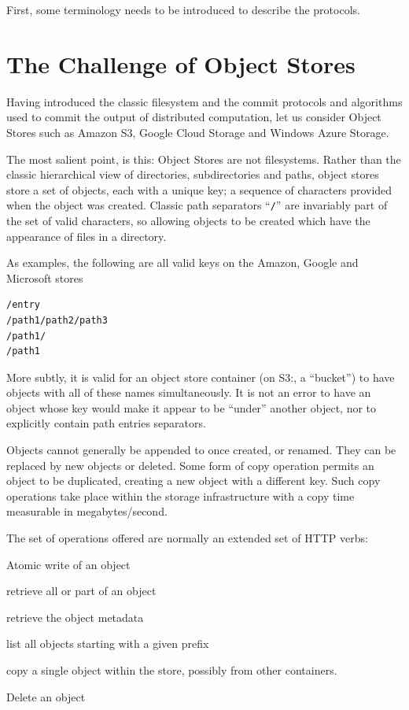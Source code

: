 \documentclass[manuscript]{acmart}
\begin{document}
First, some terminology needs to be introduced to describe
the protocols.


\section{The Challenge of Object Stores}
\label{sec:object-stores}

Having introduced the classic filesystem and the commit protocols and algorithms
used to commit the output of distributed computation, let us consider
Object Stores such as Amazon S3, Google Cloud Storage and
Windows Azure Storage.



The most salient point, is this: Object Stores are not filesystems.
Rather than the classic hierarchical view of directories, subdirectories
and paths, object stores store a set of objects, each with a unique key;
a sequence of characters provided when the object was created.
Classic path separators ``\texttt{/}'' are invariably part of the set of valid
characters, so allowing objects to be created which have the appearance
of files in a directory.

As examples, the following are all valid keys on the Amazon, Google and Microsoft
stores

\begin{verbatim}
/entry
/path1/path2/path3
/path1/
/path1
\end{verbatim}

More subtly, it is valid for an object store container (on S3:, a ``bucket'')
to have objects with all of these names simultaneously.
It is not an error to have an object whose key would make it appear to be
``under'' another object, nor to explicitly contain path entries separators.

Objects cannot generally be appended to once created, or renamed.
They can be replaced by new objects or deleted.
Some form of copy operation permits an object to be duplicated, creating
a new object with a different key.
Such copy operations take place within the storage infrastructure with a
copy time measurable in megabytes/second.


The set of operations offered are normally an extended set of HTTP verbs:

\begin{description}[leftmargin=8em, style=nextline]
  \item[PUT] Atomic write of an object
  \item[GET] retrieve all or part of an object
  \item[HEAD] retrieve the object metadata
  \item[LIST] list all objects starting with a given prefix
  \item[COPY] copy a single object within the store, possibly from other containers.
  \item[DELETE] Delete an object
\end{description}
\end{document}
